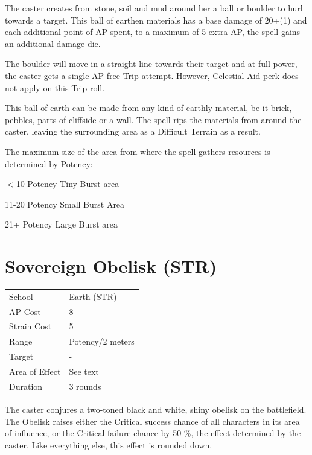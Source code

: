 \documentclass[11pt,a4paper,twocolumn]{book}
\begin{document}
	\medskip
	
	The caster creates from stone, soil and mud around her a ball or boulder to hurl towards a target. This ball of earthen materials has a base damage of 20+(1) and each additional point of AP spent, to a maximum of 5 extra AP, the spell gains an additional damage die. 
	
	The boulder will move in a straight line towards their target and at full power, the caster gets a single AP-free Trip attempt. However, Celestial Aid-perk does not apply on this Trip roll.
	
	This ball of earth can be made from any kind of earthly material, be it brick, pebbles, parts of cliffside or a wall. The spell rips the materials from around the caster, leaving the surrounding area as a Difficult Terrain as a result.
	
	The maximum size of the area from where the spell gathers resources is determined by Potency:
	
	\begin{compactitem}
		\item $<$10 Potency 		Tiny Burst area
		\item 11-20 Potency 		Small Burst Area
		\item 21+ Potency 			Large Burst area
	\end{compactitem}
	
			\section*{Sovereign Obelisk (STR)}
	{
		\begin{tabu} to 75mm{| X[l,4] | X[l,7] |}
			\hline
			School 			&  Earth (STR)			\\
			AP Cost	      	&  8					\\
			Strain Cost     &  5					\\
			Range     		&  Potency/2 meters		\\
			Target      	&  -					\\
			Area of Effect  &  See text	 			\\
			Duration     	&  3 rounds				\\ \hline
		\end{tabu}
		
	}
	
	\medskip
	
	The caster conjures a two-toned black and white, shiny obelisk on the battlefield. The Obelisk raises either the Critical success chance of all characters in its area of influence, or the Critical failure chance by 50 \%, the effect determined by the caster. Like everything else, this effect is rounded down.
	
\end{document}
